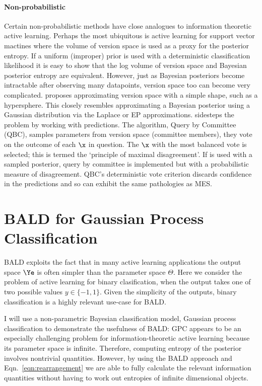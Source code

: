 \paragraph{Non-probabilistic} Certain non-probabilistic methods have close analogues to information theoretic active learning. Perhaps the most ubiquitous is active learning for support vector mactines \citep[SVM,][]{tong2001,seung1992} where the volume of version space is used as a proxy for the posterior entropy. If a uniform (improper) prior is used with a deterministic classification likelihood it is easy to show that the log volume of version space and Bayesian posterior entropy are equivalent. However, just as Bayesian posteriors become intractable after observing many datapoints, version space too can become very complicated. \citep{tong2001} proposes approximating version space with a simple shape, such as a hypersphere. This closely resembles approximating a Bayesian posterior using a Gaussian distribution via the Laplace or EP approximations. \citep{seung1992} sidesteps the problem by working with predictions. The algorithm, Query by Committee (QBC), samples parameters from version space (committee members), they vote on the outcome of each $\x$ in question. The $\x$ with the most balanced vote is selected; this is termed the `principle of maximal disagreement'. If \ourmethod is used with a sampled posterior, query by committee is implemented but with a probabilistic measure of disagreement. QBC's deterministic vote criterion discards confidence in the predictions and so can exhibit the same pathologies as MES.


\section{BALD for Gaussian Process Classification}

BALD exploits the fact that in many active learning applications the output space $\Ye$ is often simpler than the parameter space $\Theta$. Here we consider the problem of active learning for binary clasification, when the output takes one of two possible values $y \in \{-1,1\}$. Given the simplicity of the outputs, binary classification is a highly relevant use-case for BALD.

I will use a non-parametric Bayesian classification model, Gaussian process classification \citep[GPC,][]{rasmussen06GP} to demonstrate the usefulness of BALD: GPC appears to be an especially challenging problem for information-theoretic active learning because its parameter space is infinite. Therefore, computing entropy of the posterior involves nontrivial quantities. However, by using the BALD approach and Eqn.\ \eqref{eqn:rearrangement} we are able to fully calculate the relevant information quantities without having to work out entropies of infinite dimensional objects. 


